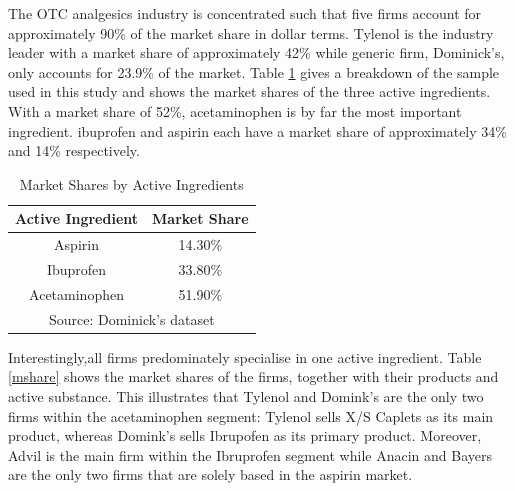 \documentclass[12pt, authoryear]{elsarticle}
\begin{document}
The OTC analgesics industry is concentrated such that five firms account for approximately 90\% of the market share in dollar terms. Tylenol is the industry leader with a market share of approximately 42\% while generic firm, Dominick's, only accounts for 23.9\% of the market. Table \ref{active_share} gives a  breakdown of the sample used in this study and shows the market shares of the three active ingredients. With a market share of 52\%, acetaminophen is by far the most important ingredient. ibuprofen and aspirin each have a market share of approximately 34\% and 14\% respectively.

\begin{table}[H]
	\caption{Market Shares by Active Ingredients}
	\label{active_share}
	\begin{tabular}{cc} \hline  \hline
		\textbf{Active Ingredient}  \cellcolor{gray!25} & \textbf{Market Share}  \cellcolor{gray!25} \\ \hline
		Aspirin & 14.30\% \\
		Ibuprofen & 33.80\% \\
		Acetaminophen & 51.90\% \\ \hline \hline
		\multicolumn{2}{c}{Source: Dominick's dataset}     
	\end{tabular}
\end{table}

Interestingly,all firms predominately specialise in one active ingredient. Table \ref{mshare}  shows the market shares of the firms, together with their products and active substance. This  illustrates that Tylenol and Domink's are the only two firms within the acetaminophen segment: Tylenol sells X/S Caplets as its main product, whereas Domink's sells Ibrupofen as its primary product. Moreover, Advil is the main firm within the Ibruprofen segment while Anacin and Bayers are the only two firms that are solely based in the aspirin market. 
\end{document}
